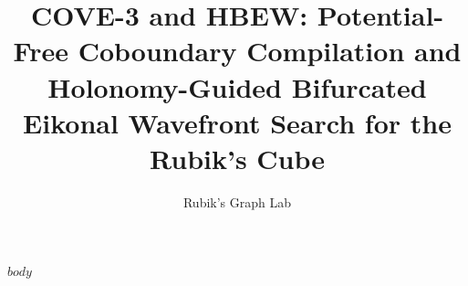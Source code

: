 \documentclass[10pt,twocolumn,letterpaper]{article}
\title{COVE-3 and HBEW: Potential-Free Coboundary Compilation and\\
Holonomy-Guided Bifurcated Eikonal Wavefront Search for the Rubik's Cube}
\author{Rubik's Graph Lab}
\begin{document}
\maketitle
$body$
\end{document}
